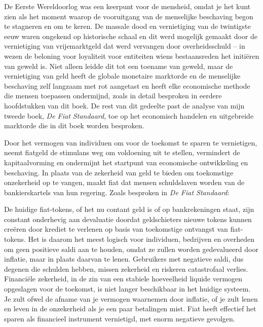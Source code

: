 De Eerste Wereldoorlog was een keerpunt voor de mensheid, omdat je het kunt zien als het moment waarop de vooruitgang van de menselijke beschaving begon te stagneren en om te keren. De massale dood en vernietiging van de twintigste eeuw waren ongekend op historische schaal en dit werd mogelijk gemaakt door de vernietiging van vrijemarktgeld dat werd vervangen door overheidsschuld -- in wezen de beloning voor loyaliteit voor entiteiten wiens bestaansreden het initiëren van geweld is.\autocite{223} Niet alleen leidde dit tot een toename van geweld, maar de vernietiging van geld heeft de globale monetaire marktorde en de menselijke beschaving zelf langzaam met rot aangetast en heeft elke economische methode die mensen toepassen ondermijnd, zoals in detail besproken in eerdere hoofdstukken van dit boek. De rest van dit gedeelte past de analyse van mijn tweede boek, \emph{De Fiat Standaard}, toe op het economisch handelen en uitgebreide marktorde die in dit boek worden besproken.

Door het vermogen van individuen om voor de toekomst te sparen te vernietigen, neemt fiatgeld de stimulans weg om voldoening uit te stellen, vermindert de kapitaalvorming en ondermijnt het startpunt van economische ontwikkeling en beschaving. In plaats van de zekerheid van geld te bieden om toekomstige onzekerheid op te vangen, maakt fiat dat mensen schuldslaven worden van de bankierskartels van hun regering. Zoals besproken in \emph{De Fiat Standaard}:

\begin{blockquotebox}
    De huidige fiat-tokens, of het nu contant geld is of op bankrekeningen staat, zijn constant onderhevig aan devaluatie doordat geldschieters nieuwe tokens kunnen creëren door krediet te verlenen op basis van toekomstige ontvangst van fiat-tokens. Het is daarom het meest logisch voor individuen, bedrijven en overheden om geen positieve saldi aan te houden, omdat ze zullen worden gedevalueerd door inflatie, maar in plaats daarvan te lenen. Gebruikers met negatieve saldi, dus degenen die schulden hebben, missen zekerheid en riskeren catastrofaal verlies. Financiële zekerheid, in de zin van een stabiele hoeveelheid liquide vermogen opgeslagen voor de toekomst, is niet langer beschikbaar in het huidige systeem. Je zult ofwel de afname van je vermogen waarnemen door inflatie, of je zult lenen en leven in de onzekerheid als je een paar betalingen mist. Fiat heeft effectief het sparen als financieel instrument vernietigd, met enorm negatieve gevolgen.\footnotemark
\end{blockquotebox}
\autocite{224}

